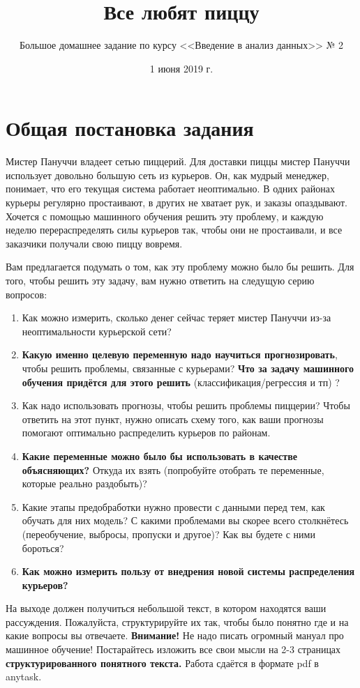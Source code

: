 \documentclass[12pt, a4paper, oneside]{article}
\title{Все любят пиццу}
\author{Большое домашнее задание по курсу <<Введение в анализ данных>> № 2}
\date{1 июня 2019 г.}
\begin{document}
\maketitle

\section{Общая постановка задания}

Мистер Пануччи владеет сетью пиццерий. Для доставки пиццы мистер Пануччи использует довольно большую сеть из курьеров. Он, как  мудрый менеджер, понимает, что его текущая система работает неоптимально. В одних районах курьеры регулярно простаивают, в других не хватает рук, и заказы опаздывают. Хочется с помощью машинного обучения решить эту проблему, и каждую неделю перераспределять силы курьеров так, чтобы они не простаивали, и все заказчики получали свою пиццу вовремя. 

Вам предлагается подумать о том, как эту проблему можно было бы решить. Для того, чтобы решить эту задачу, вам нужно ответить на следущую серию вопросов: 


\begin{enumerate} 
	\item Как можно измерить, сколько денег сейчас теряет мистер Пануччи из-за неоптимальности курьерской сети? 
	\item \textbf{Какую именно целевую переменную надо научиться прогнозировать}, чтобы решить проблемы, связанные с курьерами? \textbf{Что за задачу машинного обучения  придётся для этого решить} (классификация/регрессия и тп) ?
	\item Как надо использовать прогнозы, чтобы решить проблемы пиццерии? Чтобы ответить на этот пункт, нужно описать схему того, как ваши прогнозы помогают оптимально распределить курьеров по районам.
    \item \textbf{Какие переменные можно было бы использовать в качестве объясняющих?} Откуда их взять (попробуйте отобрать те переменные, которые реально раздобыть)?
    \item Какие этапы предобработки нужно провести с данными перед тем, как обучать для них модель? С какими проблемами вы скорее всего столкнётесь (переобучение, выбросы, пропуски и другое)? Как вы будете с ними бороться? 
    \item \textbf{Как можно измерить пользу от внедрения новой системы распределения курьеров?} 
\end{enumerate}

На выходе должен получиться небольшой текст, в котором находятся ваши рассуждения. Пожалуйста, структурируйте их так, чтобы было понятно где и на какие вопросы вы отвечаете. \textbf{Внимание!}  Не надо писать огромный мануал про машинное обучение! Постарайтесь изложить все свои мысли на 2-3 страницах \textbf{структурированного понятного текста.}  Работа сдаётся в формате pdf в anytask. 
\end{document}
